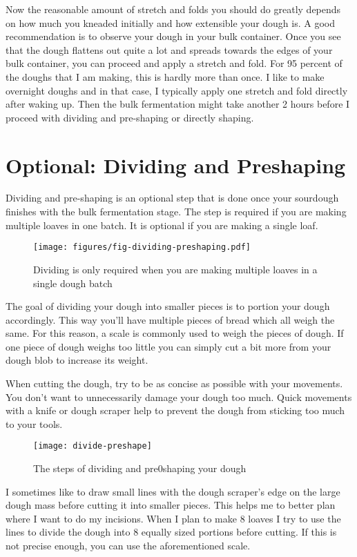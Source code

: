 Now the reasonable amount of stretch and folds you should do greatly depends on how much you
kneaded initially and how extensible your dough is. A good recommendation is
to observe your dough in your bulk container. Once you see that the dough
flattens out quite a lot and spreads towards the edges of your bulk container,
you can proceed and apply a stretch and fold. For 95 percent of the doughs
that I am making, this is hardly more than once. I like to make overnight
doughs and in that case, I typically apply one stretch and fold directly after
waking up. Then the bulk fermentation might take another 2 hours before I
proceed with dividing and pre-shaping or directly shaping.

\section{Optional: Dividing and Preshaping}

Dividing and pre-shaping is an optional step that is done
once your sourdough finishes with the bulk fermentation stage.
The step is required if you are making multiple loaves in one
batch. It is optional if you are making a single loaf.

\begin{figure}[!htb]
  \texttt{[image: figures/fig-dividing-preshaping.pdf]}
  \caption{Dividing is only required when you are making multiple loaves in a single dough batch}
  \label{fig:dividing-decision-tree}
\end{figure}

The goal of dividing your dough into smaller pieces is to portion
your dough accordingly. This way you'll have multiple pieces of bread
which all weigh the same. For this reason, a scale is commonly
used to weigh the pieces of dough. If one piece of dough weighs
too little you can simply cut a bit more from your dough blob
to increase its weight.

When cutting the dough, try to be as concise as possible with your
movements. You don't want to unnecessarily damage your dough too much.
Quick movements with a knife or dough scraper help to prevent the
dough from sticking too much to your tools.

\begin{figure}[!htb]
  \texttt{[image: divide-preshape]}
  \caption{The steps of dividing and pre0shaping your dough}
\end{figure}

I sometimes like to draw small lines with the dough scraper's edge
on the large dough mass before cutting it into smaller pieces.
This helps me to better plan where I want to do my incisions. When
I plan to make 8 loaves I try to use the lines to divide the dough
into 8 equally sized portions before cutting. If this is not precise enough,
you can use the aforementioned scale.


